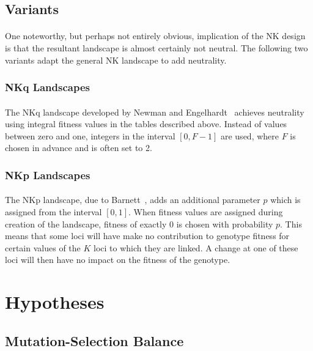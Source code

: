 \documentclass[12pt,letterpaper,titlepage]{article}
\begin{document}
\subsection{Variants}

\paragraph{}
One noteworthy, but perhaps not entirely obvious, implication of the NK design
is that the resultant landscape is almost certainly not neutral. The following
two variants adapt the general NK landscape to add neutrality.

\subsubsection{NKq Landscapes}

\paragraph{}
The NKq landscape developed by Newman and Engelhardt~\cite{Newman1998} achieves
neutrality using integral fitness values in the tables described above. Instead
of values between zero and one, integers in the interval $\left[0,F-1\right]$
are used, where $F$ is chosen in advance and is often set to 2.

\subsubsection{NKp Landscapes}

\paragraph{}
The NKp landscape, due to Barnett~\cite{Barnett1998}, adds an additional
parameter $p$ which is assigned from the interval $\left[0,1\right]$. When
fitness values are assigned during creation of the landscape, fitness of
exactly 0 is chosen with probability $p$. This means that some loci will have
make no contribution to genotype fitness for certain values of the $K$ loci to
which they are linked. A change at one of these loci will then have no impact
on the fitness of the genotype.

\section{Hypotheses}

\subsection{Mutation-Selection Balance}
\end{document}
